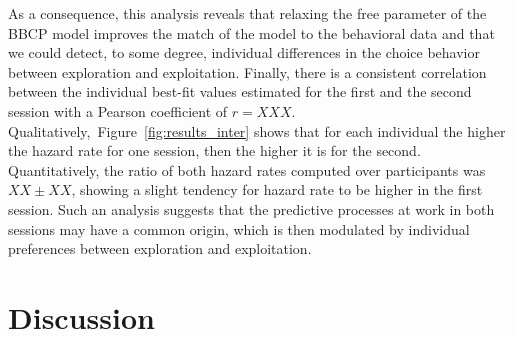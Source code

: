 \documentclass[12pt,english]{article}%
\newcommand{\ms}{\si{\milli\second}}%
\newcommand{\citep}[1]{\parencite{#1}}
\newcommand{\seeFig}[1]{Figure~\ref{fig:#1}}
\newcommand{\AM}[1]{\textbf{\textcolor{blue}{[AM: #1]}}}
\begin{document}
As a consequence, this analysis reveals
that relaxing the free parameter of the BBCP model
improves the match of the model to the behavioral data and
that we could detect, to some degree, individual differences in the choice behavior
between exploration and exploitation.
Finally, there is a  consistent
correlation between the individual best-fit values estimated for the first and the second session
with a Pearson coefficient of $r = XXX$.
Qualitatively,~\seeFig{results_inter} shows that for each individual the higher the hazard rate for one session, then the higher it is for the second.
Quantitatively, the ratio of both hazard rates computed over participants was $XX \pm XX$,
showing a slight tendency for hazard rate to be higher in the first session.
Such an analysis suggests that the predictive processes
at work in both sessions may have a common origin,
which is then modulated by individual preferences
between exploration and exploitation.
\section{Discussion}
\label{sec:outro}




\end{document}
